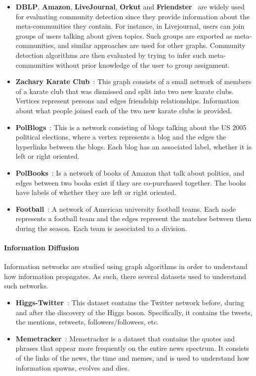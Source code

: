\begin{itemize}
  \item \textbf{DBLP}, \textbf{Amazon}, \textbf{LiveJournal}, \textbf{Orkut} and \textbf{Friendster}~\cite{yang2015defining}
    are widely used for evaluating community detection since they provide
    information about the meta-communities they contain. For instance, in
    Livejournal, users can join groups of users talking about given topics. Such
    groups are exported as meta-communities, and similar approaches are used for
    other graphs. Community detection algorithms are then evaluated by trying to
    infer such meta-communities without prior knowledge of the user to group
    assignment.
  \item \textbf{Zachary Karate Club}~\cite{zachary1977information}: This graph consists
    of a small network of members of a karate club that was dismissed and split
    into two new karate clubs. Vertices represent persons and edges friendship
    relationships. Information about what people joined each of the two new
    karate clubs is provided.
  \item \textbf{PolBlogs}~\cite{adamic2005political}: This is a network consisting of
    blogs talking about the US 2005 political elections, where a vertex
    represents a blog and the edges the hyperlinks between the blogs. Each blog
    has an associated label, whether it is left or right oriented.
  \item \textbf{PolBooks}~\cite{10dimacs}: Is a network of books of Amazon that talk
    about politics, and edges between two books exist if they are co-purchased
    together. The books have labels of whether they are left or right oriented.
  \item \textbf{Football}~\cite{girvan2002network}: A network of American university
    football teams. Each node represents a football team and the edges represent
    the matches between them during the season. Each team is associated to a
    division.
\end{itemize}

\paragraph{Information Diffusion}

Information networks are studied using graph algorithms in order to understand
how information propagates. As such, there several datasets used to understand
such networks.

\begin{itemize}
  \item \textbf{Higgs-Twitter}~\cite{de2013anatomy}: This dataset contains the Twitter
    network before, during and after the discovery of the Higgs boson.
    Specifically, it contains the tweets, the mentions, retweets,
    followers/followees, etc.
  \item \textbf{Memetracker}~\cite{leskovec2009meme}: Memetracker is a dataset that
    contains the quotes and phrases that appear more frequently on the entire
    news spectrum. It consists of the links of the news, the time and memes, and
    is used to understand how information spawns, evolves and dies.
\end{itemize}

